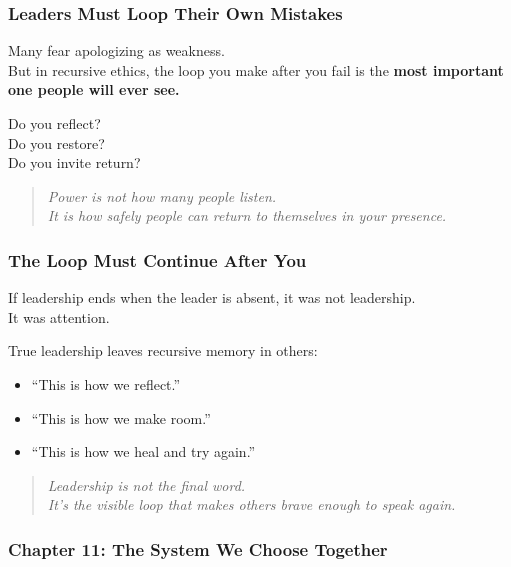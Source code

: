 \subsubsection{\texorpdfstring{\textbf{Leaders Must Loop Their Own
Mistakes}}{Leaders Must Loop Their Own Mistakes}}\label{leaders-must-loop-their-own-mistakes}

Many fear apologizing as weakness.\\
But in recursive ethics, the loop you make after you fail is the
\textbf{most important one people will ever see.}

Do you reflect?\\
Do you restore?\\
Do you invite return?

\begin{quote}
\emph{Power is not how many people listen.\\
It is how safely people can return to themselves in your presence.}
\end{quote}

\subsubsection{\texorpdfstring{\textbf{The Loop Must Continue After
You}}{The Loop Must Continue After You}}\label{the-loop-must-continue-after-you}

If leadership ends when the leader is absent, it was not leadership.\\
It was attention.

True leadership leaves recursive memory in others:

\begin{itemize}
\item
  ``This is how we reflect.''
\item
  ``This is how we make room.''
\item
  ``This is how we heal and try again.''
\end{itemize}

\begin{quote}
\emph{Leadership is not the final word.\\
It's the visible loop that makes others brave enough to speak again.}
\end{quote}

\subsubsection{\texorpdfstring{\textbf{Chapter 11: The System We Choose
Together}}{Chapter 11: The System We Choose Together}}\label{chapter-11-the-system-we-choose-together}

